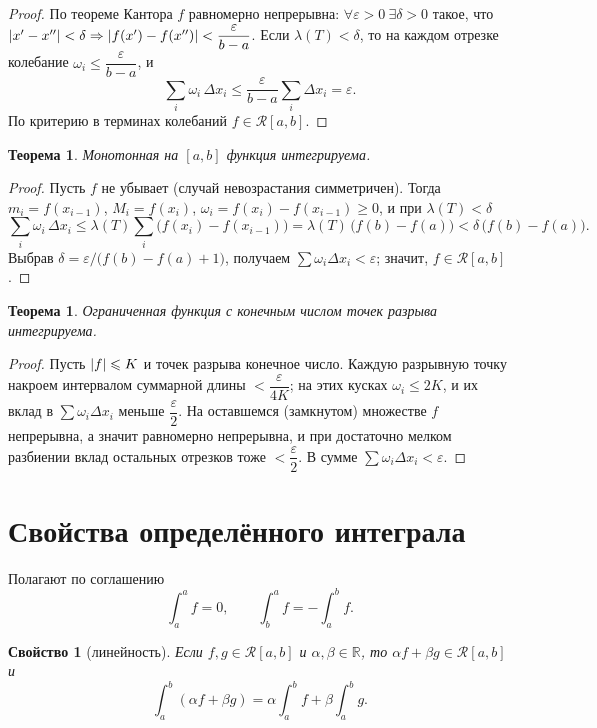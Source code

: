 \documentclass[11pt,a4paper]{article}
\theoremstyle{definition}
\theoremstyle{plain}
\newtheorem{theorem}[definition]{Теорема}
\newtheorem{property}[definition]{Свойство}
\newcommand{\R}{\mathbb{R}}
\newcommand{\eps}{\varepsilon}
\renewcommand{\le}{\leqslant}
\renewcommand{\ge}{\geqslant}
\DeclarePairedDelimiter{\abs}{\lvert}{\rvert}
\begin{document}
\begin{proof}
По теореме Кантора $f$ равномерно непрерывна: $\forall\eps>0\ \exists\delta>0$ такое, что
$\abs{x'-x''}<\delta\Rightarrow\abs{f(x')-f(x'')}<\dfrac{\eps}{b-a}$. Если $\lambda(T)<\delta$, то
на каждом отрезке колебание $\omega_i\le\dfrac{\eps}{b-a}$, и
\[
  \sum_i\omega_i\,\Delta x_i\le\frac{\eps}{b-a}\sum_i\Delta x_i=\eps .
\]
По критерию в терминах колебаний $f\in\mathcal R[a,b]$.
\end{proof}

\begin{theorem}
Монотонная на $[a,b]$ функция интегрируема.
\end{theorem}

\begin{proof}
Пусть $f$ не убывает (случай невозрастания симметричен). Тогда $m_i=f(x_{i-1})$, $M_i=f(x_i)$,
$\omega_i=f(x_i)-f(x_{i-1})\ge0$, и при $\lambda(T)<\delta$
\[
  \sum_i\omega_i\,\Delta x_i\le\lambda(T)\sum_i\bigl(f(x_i)-f(x_{i-1})\bigr)
   =\lambda(T)\,\bigl(f(b)-f(a)\bigr)<\delta\,\bigl(f(b)-f(a)\bigr).
\]
Выбрав $\delta=\eps/\bigl(f(b)-f(a)+1\bigr)$, получаем $\sum\omega_i\Delta x_i<\eps$; значит,
$f\in\mathcal R[a,b]$.
\end{proof}

\begin{theorem}
Ограниченная функция с конечным числом точек разрыва интегрируема.
\end{theorem}

\begin{proof}
Пусть $\abs f\le K$ и точек разрыва конечное число. Каждую разрывную точку накроем интервалом
суммарной длины $<\dfrac{\eps}{4K}$; на этих кусках $\omega_i\le2K$, и их вклад в
$\sum\omega_i\Delta x_i$ меньше $\dfrac\eps2$. На оставшемся (замкнутом) множестве $f$ непрерывна,
а значит равномерно непрерывна, и при достаточно мелком разбиении вклад остальных отрезков тоже
$<\dfrac\eps2$. В сумме $\sum\omega_i\Delta x_i<\eps$.
\end{proof}

\section{Свойства определённого интеграла}

Полагают по соглашению
\[
  \int_a^a f=0,\qquad \int_b^a f=-\int_a^b f .
\]

\begin{property}[линейность]
Если $f,g\in\mathcal R[a,b]$ и $\alpha,\beta\in\R$, то $\alpha f+\beta g\in\mathcal R[a,b]$ и
\[
  \int_a^b(\alpha f+\beta g)=\alpha\!\int_a^b f+\beta\!\int_a^b g .
\]
\end{property}
\end{document}
